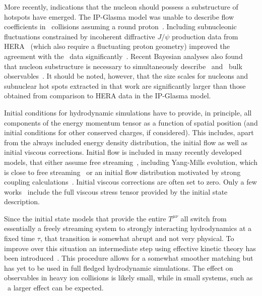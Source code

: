 More recently, indications that the nucleon should possess a substructure of hotspots 
  have emerged. 
The IP-Glasma model was unable to describe flow coefficients in \ppb\ 
  collisions assuming a round proton~\cite{Schenke:2014zha}. 
Including subnucleonic fluctuations constrained by incoherent 
  diffractive $J/\psi$ production data from HERA~\cite{Mantysaari:2016ykx} 
  (which also require a fluctuating proton geometry) improved the agreement 
  with the \ppb\ data significantly~\cite{Mantysaari:2017cni}. 
Recent Bayesian analyses also found that nucleon substructure is necessary 
  to simultaneously describe \ppb\ and \pbpb\ bulk observables~\cite{Moreland:2018gsh}.
It should be noted, however, that the size scales for nucleons and subnuclear 
  hot spots extracted in that work are significantly larger than those obtained
  from comparison to HERA data in the IP-Glasma model.

Initial conditions for hydrodynamic simulations have to provide, in principle, 
  all components of the energy momentum tensor as a function of spatial position 
  (and initial conditions for other conserved charges, if considered). 
This includes, apart from the always included energy density distribution, 
  the initial flow as well as initial viscous corrections. 
Initial flow is included in many recently developed models, that either assume 
  free streaming~\cite{Moreland:2018gsh}, including Yang-Mills evolution, which 
  is close to free streaming~\cite{Gale:2012rq} or an initial flow distribution 
  motivated by strong coupling calculations~\cite{Weller:2017tsr}. 
Initial viscous corrections are often set to zero. 
Only a few works~\cite{Mantysaari:2017cni,Schenke:2018fci,Moreland:2018gsh} 
  include the full viscous stress tensor provided by the initial state description.

Since the initial state models that provide the entire $T^{\mu\nu}$ all switch 
  from essentially a freely streaming system to strongly interacting hydrodynamics 
  at a fixed time $\tau$, that transition is somewhat abrupt and not very physical. 
To improve over this situation an intermediate step using effective kinetic theory 
  has been introduced~\cite{Kurkela:2018wud,Kurkela:2018vqr}. 
This procedure allows for a somewhat smoother matching but has yet to be used in 
  full fledged hydrodynamic simulations. 
The effect on observables in heavy ion collisions is likely small, while in small 
  systems, such as \pA\ a larger effect can be expected.

